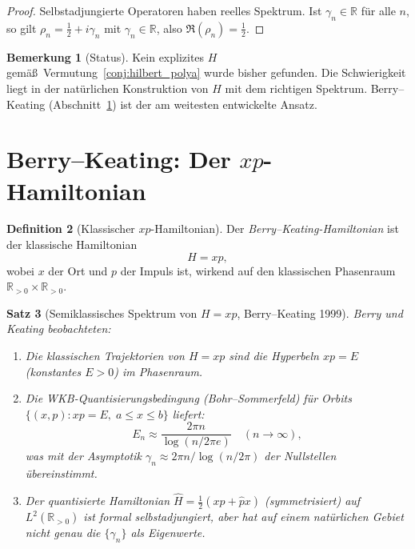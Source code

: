 \documentclass[12pt,a4paper]{amsart}
\newtheorem{theorem}{Satz}[section]
\theoremstyle{definition}
\newtheorem{definition}[theorem]{Definition}
\newtheorem{remark}[theorem]{Bemerkung}
\newcommand{\R}{\mathbb{R}}
\begin{document}
\begin{proof}
Selbstadjungierte Operatoren haben reelles Spektrum. Ist $\gamma_n \in \R$
f\"ur alle $n$, so gilt $\rho_n = \tfrac{1}{2} + i\gamma_n$ mit
$\gamma_n \in \R$, also $\Re(\rho_n) = \tfrac{1}{2}$.
\end{proof}

\begin{remark}[Status]
Kein explizites $H$ gem\"a\ss\ Vermutung~\ref{conj:hilbert_polya} wurde bisher
gefunden. Die Schwierigkeit liegt in der nat\"urlichen Konstruktion von $H$
mit dem richtigen Spektrum.
Berry--Keating (Abschnitt~\ref{sec:berry_keating}) ist der am weitesten
entwickelte Ansatz.
\end{remark}

\section{Berry--Keating: Der \texorpdfstring{$xp$}{xp}-Hamiltonian}
\label{sec:berry_keating}

\begin{definition}[Klassischer $xp$-Hamiltonian]
\label{def:xp}
Der \emph{Berry--Keating-Hamiltonian} ist der klassische Hamiltonian
\[
  H = xp,
\]
wobei $x$ der Ort und $p$ der Impuls ist, wirkend auf den klassischen
Phasenraum $\R_{>0} \times \R_{>0}$.
\end{definition}

\begin{theorem}[Semiklassisches Spektrum von $H=xp$, Berry--Keating 1999]
\label{thm:berry_keating}
Berry und Keating \cite{BerryKeating1999} beobachteten:
\begin{enumerate}
  \item[\textup{(i)}] Die klassischen Trajektorien von $H = xp$ sind
    die Hyperbeln $xp = E$ (konstantes $E > 0$) im Phasenraum.
  \item[\textup{(ii)}] Die WKB-Quantisierungsbedingung (Bohr--Sommerfeld)
    f\"ur Orbits $\{(x,p) : xp = E,\; a \le x \le b\}$ liefert:
    \[
      E_n \approx \frac{2\pi n}{\log(n/2\pi e)} \quad (n \to \infty),
    \]
    was mit der Asymptotik $\gamma_n \approx 2\pi n/\log(n/2\pi)$ der
    Nullstellen \"ubereinstimmt.
  \item[\textup{(iii)}] Der quantisierte Hamiltonian
    $\hat H = \tfrac{1}{2}(x\hat p + \hat p x)$
    (symmetrisiert) auf $L^2(\R_{>0})$ ist formal selbstadjungiert,
    aber hat auf einem nat\"urlichen Gebiet nicht genau die $\{\gamma_n\}$
    als Eigenwerte.
\end{enumerate}
\end{theorem}
\end{document}
